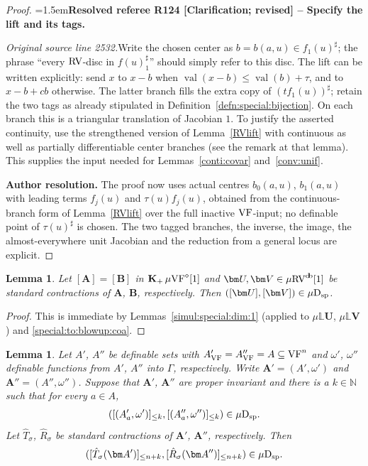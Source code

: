 \documentclass[12pt]{amsart}
\newcommand{\ResolvedRefereeRemark}[5]{%
  \par\medskip\begingroup\normalfont\small\color{gray}%
  \emergencystretch=1.5em\noindent\textbf{Resolved referee R#1 [#2] -- #3.}\par\nobreak\noindent #4\par
  \medskip\color{ResolutionGreen}\noindent\textbf{Author resolution.} #5\par
  \endgroup\medskip
}
\theoremstyle{plain}
\newtheorem{lem}[thm]{Lemma}
\theoremstyle{definition}
\theoremstyle{remark}
\numberwithin{equation}{section}
\theoremstyle{plain}
\newcommand{\VF}{\textup{VF}}
\newcommand{\RV}{\textup{RV}}
\newcommand{\N}{\mathds{N}}
\newcommand{\0}{\emptyset}
\newcommand{\bb}[1]{\mathbb{#1}}
\newcommand{\sub}{\subseteq}
\newcommand{\mVF}{{\mu}{\VF}}
\newcommand{\mRV}{{\mu}{\RV}}
\newcommand{\dsp}{\textup{D}_{\textup{sp}}}
\newcommand{\mispdb}{\mu \dsp}
\newcommand{\mL}{{\mu}{\bb L}}
\DeclareMathOperator{\vv}{val}
\DeclareMathOperator{\gsk}{\mathbf{K}_+}
\DeclareMathOperator{\db}{d \! b}
\begin{document}
\begin{proof}
\ResolvedRefereeRemark{124}{Clarification; revised}{Specify the lift and its tags}{%
\textit{Original source line 2532.}\quad Write the chosen center as $b=b(a,u)\in f_1(u)^\sharp$; the phrase ``every $\RV$-disc in $f(u)_1^\sharp$'' should simply refer to this disc. The lift can be written explicitly: send $x$ to $x-b$ when $\vv(x-b)\leq\vv(b)+\tau$, and to $x-b+cb$ otherwise. The latter branch fills the extra copy of $(tf_1(u))^\sharp$; retain the two tags as already stipulated in Definition~\ref{defn:special:bijection}. On each branch this is a triangular translation of Jacobian $1$. To justify the asserted continuity, use the strengthened version of Lemma~\ref{RVlift} with continuous as well as partially differentiable center branches (see the remark at that lemma). This supplies the input needed for Lemmas~\ref{conti:covar} and~\ref{conv:unif}.
}{The proof now uses actual centres $b_0(a,u)$, $b_1(a,u)$ with leading terms $f_j(u)$ and $\tau(u)f_j(u)$, obtained from the continuous-branch form of Lemma~\ref{RVlift} over the full inactive $\VF$-input; no definable point of $\tau(u)^\sharp$ is chosen. The two tagged branches, the inverse, the image, the almost-everywhere unit Jacobian and the reduction from a general locus are explicit.}
\end{proof}



\begin{lem}\label{kernel:dim:1:coa}
Let $[\bm A] = [\bm B]$ in  $\gsk \mVF^{\diamond}[1]$ and $\bm U, \bm V \in \mRV^{\db}[1]$ be standard contractions of $\bm A$, $\bm B$, respectively. Then $([\bm U], [\bm V]) \in \mispdb$.
\end{lem}
\begin{proof}
This is immediate by Lemmas~\ref{simul:special:dim:1} (applied to $\mL \bm U$, $\mL \bm V$) and \ref{special:to:blowup:coa}.
\end{proof}

\begin{lem}\label{isp:VF:fiberwise:contract}
Let $A'$, $A''$ be definable sets with $A'_{\VF} = A''_{\VF} = A \sub \VF^n$ and $\omega'$, $\omega''$ definable functions from $A'$, $A''$ into $\Gamma$, respectively. Write $\bm A' = (A', \omega')$ and $\bm A'' = (A'', \omega'')$. Suppose that $\bm A'$, $\bm A''$ are proper invariant and there is a $k \in \N$ such that for  every $a \in A$,
\begin{equation}\label{condi:fiber}
([(A'_a, \omega')]_{\leq k}, [(A''_a, \omega'')]_{\leq k}) \in \mispdb.
\end{equation}
Let $\hat T_{\sigma}$, $\hat R_{\sigma}$ be standard contractions of $\bm A'$, $\bm A''$, respectively. Then
\[
([\hat T_{\sigma}(\bm A')]_{\leq n+k}, [\hat R_{\sigma}(\bm A'')]_{\leq n+k}) \in \mispdb.
\]
\end{lem}
\end{document}
